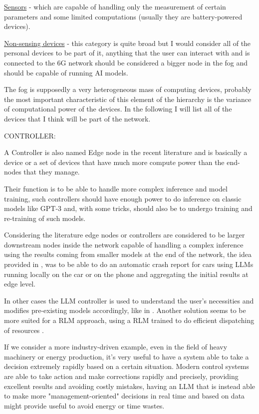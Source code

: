 \underline{Sensors} - which are capable of handling only the measurement of certain parameters and some limited computations (usually they are battery-powered devices).

\underline{Non-sensing devices} - this category is quite broad but I would consider all of the personal
devices to be part of it, anything that the user can interact with and is connected to the 6G network should be considered a bigger node in the fog and should be capable of running AI models.

The fog is supposedly a very heterogeneous mass of computing devices, probably the most important
characteristic of this element of the hierarchy is the variance of computational power of the
devices. In the following I will list all of the devices that I think will be part of the network.

\bigskip
\noindent
CONTROLLER:
\label{ssec:controller}

A Controller is also named Edge node in the recent literature and is basically a device or a set of
devices that have much more compute power than the end-nodes that they manage.

Their function is to be able to handle more complex inference and model training, such controllers
should have enough power to do inference on classic models like GPT-3 and, with some tricks, should
also be to undergo training and re-training of such models.

Considering the literature edge nodes or controllers are considered to be larger downstream nodes inside the
network capable of handling a complex inference using the results coming from smaller models at the
end of the network, the idea provided in \cite{pga}, was to be able to do an automatic crash report
for cars using LLMs running locally on the car or on the phone and aggregating the initial results
at edge level.

In other cases the LLM controller is used to understand the user's necessities and modifies
pre-existing models accordingly, like in \cite{ai4ci}. Another solution seems to be more suited for a RLM
approach, using a RLM trained to do efficient dispatching of resources \cite{llm6G}.

If we consider a more industry-driven example, even in the field of heavy machinery or energy
production, it's very useful to have a system able to take a decision extremely rapidly based on a
certain situation. Modern control systems are able to take action and make corrections rapidly and
precisely, providing excellent results and avoiding costly mistakes, having an LLM that is instead able
to make more "management-oriented" decisions in real time and based on data might provide useful to avoid
energy or time wastes.

